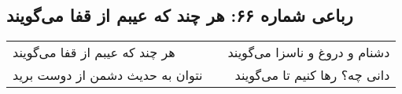 \begin{center}
\section*{رباعی شماره ۶۶: هر چند که عیبم از قفا می‌گویند}
\label{sec:066}
\begin{longtable}{l p{0.5cm} r}
هر چند که عیبم از قفا می‌گویند
&&
دشنام و دروغ و ناسزا می‌گویند
\\
نتوان به حدیث دشمن از دوست برید
&&
دانی چه؟ رها کنیم تا می‌گویند
\\
\end{longtable}
\end{center}
